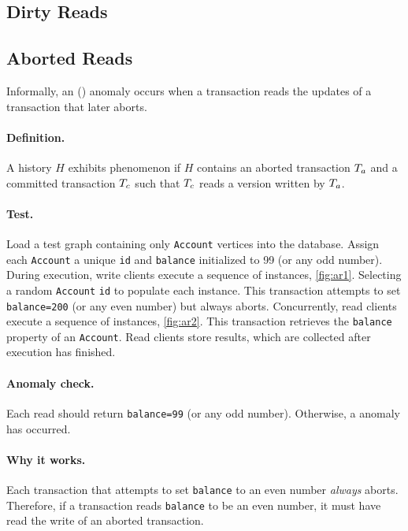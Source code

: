 \subsection{Dirty Reads}
\label{sec:dirty-reads}

\subsection*{Aborted Reads}

Informally, an  () anomaly occurs when a
transaction reads the updates of a transaction that later aborts.

\paragraph{Definition.}
A history $H$ exhibits phenomenon  if $H$ contains an aborted
transaction $T_a$ and a committed transaction $T_c$ such that
$T_c$ reads a version written by $T_a$.

\paragraph{Test.}
Load a test graph containing only \texttt{Account} vertices into the database.
Assign each \texttt{Account} a unique \texttt{id} and \texttt{balance}
initialized to 99 (or any odd number). During execution, write clients execute
a sequence of  instances, \autoref{fig:ar1}. Selecting a
random \texttt{Account} \texttt{id} to populate each instance. This transaction
attempts to set \texttt{balance=200} (or any even number) but always aborts.
Concurrently, read clients execute a sequence of 
instances, \autoref{fig:ar2}. This transaction retrieves the \texttt{balance}
property of an \texttt{Account}. Read clients store results, which are collected
after execution has finished.

\paragraph{Anomaly check.}
Each read should return \texttt{balance=99} (or any odd number). Otherwise, a
 anomaly has occurred.

\paragraph{Why it works.}
Each transaction that attempts to set \texttt{balance} to an even number
\emph{always} aborts. Therefore, if a transaction reads \texttt{balance} to be
an even number, it must have read the write of an aborted transaction.

